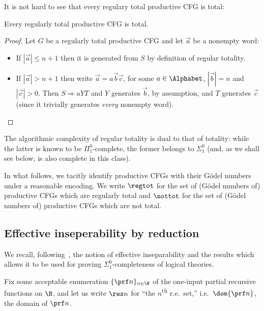 \documentclass[runningheads]{amsart}
\begin{document}
It is not hard to see that
every regulary total productive CFG is total: 

\begin{proposition}
    Every regularly total productive CFG is total.
\end{proposition}
\begin{proof}
    Let $G$ be a regularly total productive CFG and let $\vec a$ be a nonempty word:
    \begin{itemize}
        \item If $|\vec a| \leq n+1$ then it is generated from $S$ by definition of regular totality.
        \item If $|\vec a | > n+1$ then write $\vec a = a\vec b \vec c$, for some $a \in \Alphabet$, $|\vec b| = n$ and $|\vec c| > 0 $. 
        Then $S \Rightarrow a YT$ and $Y$ generates $\vec b$, by assumption, and $T$ generates $\vec c$ (since it trivially generates \emph{every} nonempty word). \qedhere
    \end{itemize}
\end{proof}

The algorithmic complexity of regular totality is dual to that of totality: while the latter is known to be $\Pi^0_1$-complete, the former belongs to $\Sigma^0_1$ (and, as we shall see below, is also complete in this class).

In what follows, we tacitly identify productive CFGs with their G\"odel numbers under a reasonable encoding. 
We write $\regtot$ for the set of (G\"odel numbers of) productive CFGs which are regularly total and $\nottot$ for the set of (G\"odel numbers of) productive CFGs which are not total.


\subsection{Effective inseperability by reduction}

We recall, following~\cite{Kuznetsov2021TOCL}, the notion of effective inseparability and the results which allows it to be used for proving $\Sigma^0_1$-completeness of logical theories. 

Fix some acceptable enumeration $\{ \prf n\}_{n\in \N}$ of the one-input partial recursive functions on $\N$, 
and let us write $\res n$ for ``the $n$\textsuperscript{th} r.e.\ set,'' i.e.\ $\dom { \prf n}$, the domain of $ \prf n$.
\end{document}
